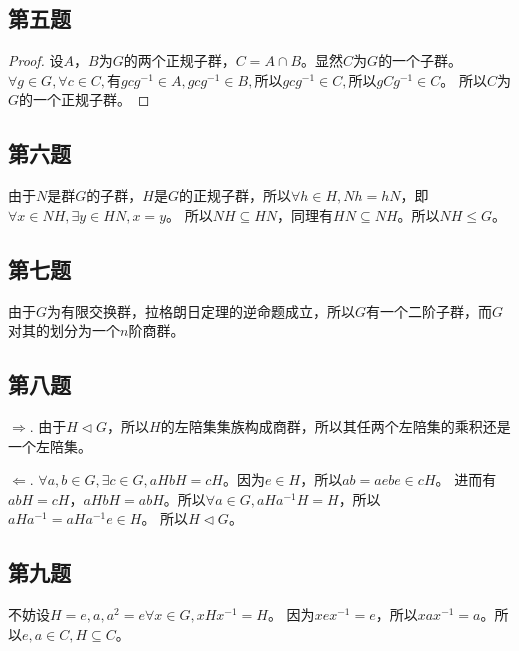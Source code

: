 \documentclass[12pt,onecolumn]{article}
\newtheorem*{proof}{证明}
\theoremstyle{plain}
\begin{document}
\subsection{第五题}
\begin{proof}
  设$A$，$B$为$G$的两个正规子群，$C = A \cap B$。显然$C$为$G$的一个子群。
  $\forall g \in G, \forall c \in C, \text{有} gcg^{-1} \in A, gcg^{-1} \in B, \text{所以} gcg^{-1} \in C, \text{所以} gCg^{-1} \in C$。
  所以$C$为$G$的一个正规子群。
\end{proof}

\subsection{第六题}
\begin{proof*}
  由于$N$是群$G$的子群，$H$是$G$的正规子群，所以$\forall h \in H, Nh = hN$，即$\forall x \in NH, \exists y \in HN, x = y$。
  所以$NH \subseteq HN$，同理有$HN \subseteq NH$。所以$NH \leq G$。
\end{proof*}

\subsection{第七题}
\begin{proof*}
  由于$G$为有限交换群，拉格朗日定理的逆命题成立，所以$G$有一个二阶子群，而$G$对其的划分为一个$n$阶商群。
\end{proof*}

\subsection{第八题}
\begin{proof*}
  $\Rightarrow$. 由于$H \triangleleft G$，所以$H$的左陪集集族构成商群，所以其任两个左陪集的乘积还是一个左陪集。

  $\Leftarrow$. $\forall a, b \in G, \exists c \in G, aHbH = cH$。因为$e \in H$，所以$ab = aebe \in cH$。
  进而有$abH = cH$，$aHbH = abH$。所以$\forall a \in G, aHa^{-1}H = H$，所以$aHa^{-1} = aHa^{-1}e \in H$。
  所以$H \triangleleft G$。
\end{proof*}

\subsection{第九题}
\begin{proof*}
  不妨设$H = {e, a}, a^2 = e\forall x \in G, xHx^{-1} = H$。
  因为$xex^{-1} = e$，所以$xax^{-1} = a$。所以$e, a \in C, H \subseteq C$。
\end{proof*}
\end{document}
